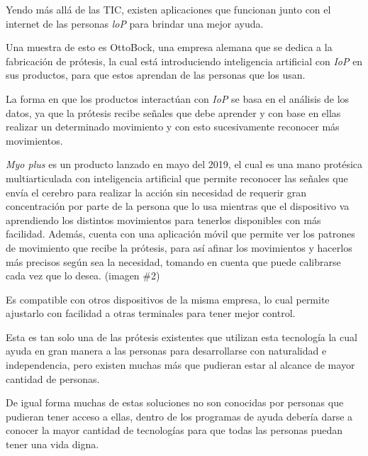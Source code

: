 \documentclass[12pt,spanish,Letterpaper,openany]{book}
\newcommand{\spacefourmilis}{\vspace{4mm}}
\begin{document}
Yendo más allá de las TIC, existen aplicaciones que funcionan junto con el internet de las personas \emph{loP} para brindar una mejor ayuda.

Una muestra de esto es OttoBock, una empresa alemana que se dedica a la fabricación de prótesis, la cual está introduciendo inteligencia artificial con \emph{IoP} en sus productos, para que estos aprendan de las personas que los usan.

La forma en que los productos interactúan con \emph{IoP} se basa en el análisis de los datos, ya que la prótesis recibe señales que debe aprender y con base en ellas realizar un determinado movimiento y con esto sucesivamente reconocer más movimientos.

\spacefourmilis

\emph{Myo plus} es un producto lanzado en mayo del 2019, el cual es una mano protésica multiarticulada con inteligencia artificial que permite reconocer las señales que envía el cerebro para realizar la acción sin necesidad de requerir gran concentración por parte de la persona que lo usa mientras que el dispositivo va aprendiendo los distintos movimientos para tenerlos disponibles con más facilidad. Además, cuenta con una aplicación móvil que permite ver los patrones de movimiento que recibe la prótesis, para así afinar los movimientos y hacerlos más precisos según sea la necesidad, tomando en cuenta que puede calibrarse cada vez que lo desea. (imagen \#2)

Es compatible con otros dispositivos de la misma empresa, lo cual permite ajustarlo con facilidad a otras terminales para tener mejor control.

Esta es tan solo una de las prótesis existentes que utilizan esta tecnología la cual ayuda en gran manera a las personas para desarrollarse con naturalidad e independencia, pero existen muchas más que pudieran estar al alcance de mayor cantidad de personas.

De igual forma muchas de estas soluciones no son conocidas por personas que pudieran tener acceso a ellas, dentro de los programas de ayuda debería darse a conocer la mayor cantidad de tecnologías para que todas las personas puedan tener una vida digna.


\spacefourmilis

\end{document}
